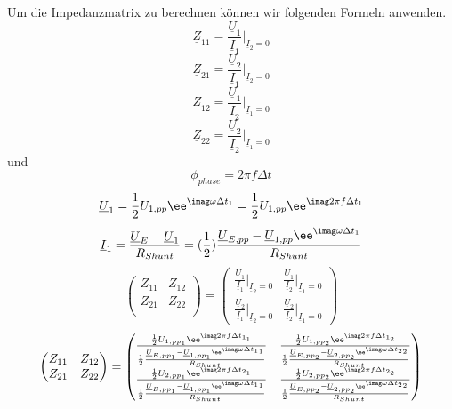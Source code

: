 Um die Impedanzmatrix zu berechnen können wir folgenden Formeln anwenden.
\[\underline{Z}_{11} = \frac{\underline{U}_1}{\underline{I}_{1}}\Bigr|_{\underline{I}_2=0} \]
\[\underline{Z}_{21} = \frac{\underline{U}_2}{\underline{I}_{1}}\Bigr|_{\underline{I}_2=0} \]
\[\underline{Z}_{12} = \frac{\underline{U}_1}{\underline{I}_{2}}\Bigr|_{\underline{I}_1=0} \]
 \[\underline{Z}_{22} = \frac{\underline{U}_2}{\underline{I}_{2}}\Bigr|_{\underline{I}_1=0} \]
%
und
\[\phi_{phase}=2\pi f \Delta t\]
\[ \underline{U}_1 = \frac{1}{2} U_{1,pp}\ee^{\imag \omega \Delta t_1} = \frac{1}{2} U_{1,pp}\ee^{\imag 2 \pi f \Delta t_1} \]
\[ \underline{I}_1 = \frac{\underline{U}_E-\underline{U}_1}{R_{Shunt}} =(\frac{1}{2})\frac{\underline{U}_{E,pp}-\underline{U}_{1,pp}\ee^{\imag  \omega \Delta t_1}}{R_{Shunt}} \]
\[\begin{pmatrix}
 Z_{11} & Z_{12} \\
 Z_{21} & Z_{22} \\
\end{pmatrix}=\begin{pmatrix}
    \frac{\underline{U}_1}{\underline{I}_{1}}\Bigr|_{\underline{I}_2=0}&
    \frac{\underline{U}_1}{\underline{I}_{2}}\Bigr|_{\underline{I}_1=0}\\
    \frac{\underline{U}_2}{\underline{I}_{1}}\Bigr|_{\underline{I}_2=0}&
    \frac{\underline{U}_2}{\underline{I}_{2}}\Bigr|_{\underline{I}_1=0} 
\end{pmatrix}
\]
\[\begin{pmatrix}
 Z_{11} & Z_{12} \\
 Z_{21} & Z_{22} \\
\end{pmatrix}=\begin{pmatrix}
    \frac{\frac{1}{2} U_{{1,pp}_{\mathrm{1}}}\ee^{\imag 2 \pi f \Delta t_{1_\mathrm{1}}} }{\frac{1}{2}\frac{\underline{U}_{{E,pp}_{\mathrm{1}}}-\underline{U}_{{1,pp}_{\mathrm{1}}}\ee^{\imag  \omega \Delta {t_1}_{\mathrm{1}}}}{R_{Shunt}}}&
    \frac{\frac{1}{2} U_{{1,pp}_{\mathrm{2}}}\ee^{\imag 2 \pi f \Delta t_{1_\mathrm{2}}} }{\frac{1}{2}\frac{\underline{U}_{{E,pp}_{\mathrm{2}}}-\underline{U}_{{2,pp}_{\mathrm{2}}}\ee^{\imag  \omega \Delta {t_2}_{\mathrm{2}}}}{R_{Shunt}}}\\
    \frac{\frac{1}{2} U_{{2,pp}_{\mathrm{1}}}\ee^{\imag 2 \pi f \Delta t_{2_\mathrm{1}}} }{\frac{1}{2}\frac{\underline{U}_{{E,pp}_{\mathrm{1}}}-\underline{U}_{{1,pp}_{\mathrm{1}}}\ee^{\imag  \omega \Delta {t_1}_{\mathrm{1}}}}{R_{Shunt}}}&
    \frac{\frac{1}{2} U_{{2,pp}_{\mathrm{2}}}\ee^{\imag 2 \pi f \Delta t_{2_\mathrm{2}}} }{\frac{1}{2}\frac{\underline{U}_{{E,pp}_{\mathrm{2}}}-\underline{U}_{{2,pp}_{\mathrm{2}}}\ee^{\imag  \omega \Delta {t_2}_{\mathrm{2}}}}{R_{Shunt}}} 
\end{pmatrix}
\]
